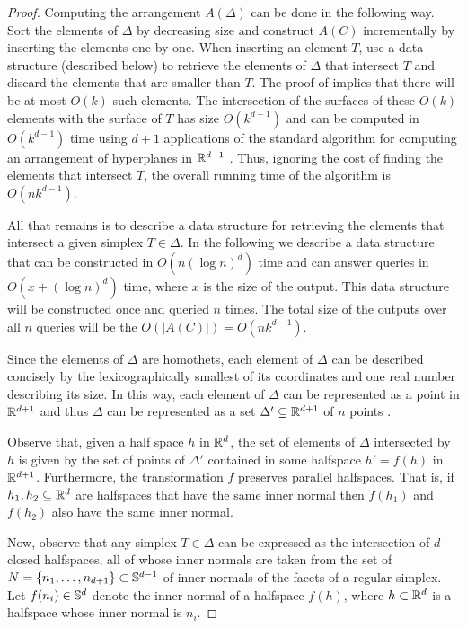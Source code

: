 \documentclass[lotsofwhite]{patmorin}
\begin{document}
\begin{proof}
  Computing the arrangement $A(\Delta)$ can be done in the following way.
  Sort the elements of $\Delta$ by decreasing size and construct $A(C)$
  incrementally by inserting the elements one by one.  When inserting
  an element $T$, use a data structure (described below) to retrieve
  the elements of $\Delta$ that intersect $T$ and discard the elements
  that are smaller than $T$.  The proof of  implies
  that there will be at most $O(k)$ such elements.  The intersection
  of the surfaces of these $O(k)$ elements with the surface of $T$ has
  size $O(k^{d-1})$ and can be computed in $O(k^{d-1})$ time using $d+1$
  applications of the standard algorithm for computing an arrangement
  of hyperplanes in $\mathbb{R}^{d-1}$ \cite{eos86,ess93}.  Thus, ignoring the
  cost of finding the elements that intersect $T$, the overall running
  time of the algorithm is $O(nk^{d-1})$.

  All that remains is to describe a data structure for retrieving the
  elements that intersect a given simplex $T\in\Delta$.  In the following
  we describe a data structure that can be constructed in $O(n(\log
  n)^{d})$ time and can answer queries in $O(x + (\log n)^{d})$ time,
  where $x$ is the size of the output.  This data structure will be
  constructed once and queried $n$ times.  The total size of the outputs
  over all $n$ queries will be the $O(|A(C)|)=O(nk^{d-1})$.

  Since the elements of $\Delta$ are homothets, each element of $\Delta$
  can be described concisely by the lexicographically smallest of its
  coordinates and one real number describing its size. In this way,
  each element of $\Delta$ can be represented as a point in $\mathbb{R}^{d+1}$
  and thus $\Delta$ can be represented as a set $\Delta'\subseteq\mathbb{R}^{d+1}$
  of $n$ points .

  Observe that, given a half space $h$ in $\mathbb{R}^d$, the set of elements of
  $\Delta$ intersected by $h$ is given by the set of points of $\Delta'$
  contained in some halfspace $h'=f(h)$ in $\mathbb{R}^{d+1}$.  Furthermore,
  the transformation $f$ preserves parallel halfspaces.  That is,
  if $h_1,h_2\subseteq{\mathbb{R}^d}$ are halfspaces that have the same inner
  normal then $f(h_1)$ and $f(h_2)$ also have the same inner normal.

  Now, observe that any simplex $T\in\Delta$ can be expressed as the
  intersection of $d$ closed halfspaces, all of whose inner normals are
  taken from the set of $N=\{n_1,\ldots,n_{d+1}\}\subset \mathbb{S}^{d-1}$ of
  inner normals of the facets of a regular simplex.  Let $f(n_i)\in\mathbb{S}^d$
  denote the inner normal of a halfspace $f(h)$, where $h\subset\mathbb{R}^d$
  is a halfspace whose inner normal is $n_i$.


\end{proof}
\end{document}
